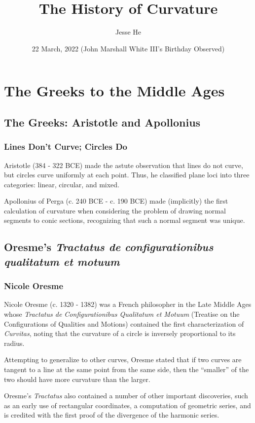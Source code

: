 \documentclass{beamer}
\title{The History of Curvature}
\author{Jesse He}
\institute{OSU Reading Classics}
\date{22 March, 2022 (John Marshall White III's Birthday Observed)}
\theoremstyle{definition}
\begin{document}
    
\frame{\titlepage}

\section{The Greeks to the Middle Ages}

\subsection{The Greeks: Aristotle and Apollonius}

\begin{frame}
    \frametitle{Lines Don't Curve; Circles Do}

    Aristotle (384 - 322 BCE) made the astute observation that lines do not curve,
    but circles curve uniformly at each point. Thus, he classified
    plane loci into three categories: linear, circular, and mixed. \cite{unsat-hist}

    Apollonius of Perga (c. 240 BCE - c. 190 BCE) made (implicitly) the first
    calculation of curvature when considering the problem of drawing normal
    segments to conic sections, recognizing that such a normal segment was unique.

\end{frame}

\subsection{Oresme's \textit{Tractatus de configurationibus qualitatum et motuum}}

\begin{frame}
    \frametitle{Nicole Oresme}

    Nicole Oresme (c. 1320 - 1382) was a French philosopher in the Late Middle Ages
    whose \textit{Tractatus de Configurationibus Qualitatum et Motuum} (Treatise
    on the Configurations of Qualities and Motions) contained the first characterization
    of \emph{Curvitas}, noting that the curvature of a circle is inversely proportional
    to its radius. \cite{unsat-hist}

    Attempting to generalize to other curves, Oresme stated that if two curves are tangent
    to a line at the same point from the same side, then the ``smaller'' of the two should
    have more curvature than the larger.

    Oresme's \emph{Tractatus} also contained a number of other important discoveries,
    such as an early use of rectangular coordinates, a computation of geometric series,
    and is credited with the first proof of the divergence of the harmonic
    series. \cite{sep-nicole-oresme}
\end{frame}
\end{document}
